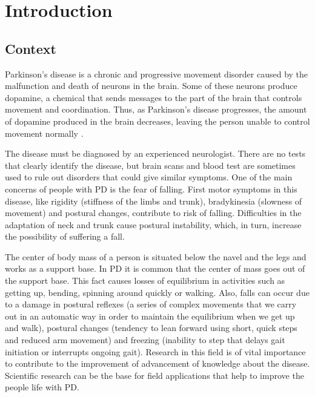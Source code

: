 
\chapter{Introduction}
\label{ch:Introduction}

\section{Context}
Parkinson’s disease is a chronic and progressive movement disorder caused by the malfunction and death of neurons in the brain. Some of these neurons produce dopamine, a chemical that sends messages to the part of the brain that controls movement and coordination. Thus, as Parkinson’s disease progresses,  the amount of dopamine produced in the brain decreases, leaving the person unable to control movement normally \cite{pdf}.

The disease must be diagnosed by an experienced neurologist. There are no tests that clearly identify the disease, but brain scans and blood test are sometimes used to rule out disorders that could give similar symptoms. 
One of the main concerns of people with PD is the fear of falling. First motor symptoms in this disease, like rigidity (stiffness  of the limbs and trunk), bradykinesia (slowness of movement) and postural changes, contribute to  risk of falling. Difficulties in the adaptation of neck and trunk cause  postural instability, which, in turn, increase the possibility of suffering a fall.

The center of body mass of a person is situated below the navel and the legs and works as a support base. In PD it is common that the center of  mass goes out of the support base. This fact causes losses of equilibrium in activities such as getting up, bending, spinning  around quickly or walking. Also, falls can occur due to a damage in postural reflexes (a series of complex movements that we carry out in an automatic way in order to maintain the equilibrium when we get up and walk), postural changes (tendency to lean forward using short, quick steps and reduced arm movement) and freezing (inability to step that delays gait initiation or interrupts ongoing gait). Research in this field is of vital importance to contribute to the improvement of advancement of knowledge about the disease. Scientific research can be the base for  field applications that help to improve the people life with PD. \cite{ParkinsonDisease}\cite{pdf}

